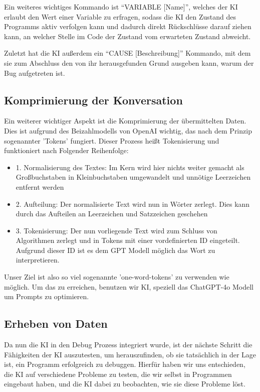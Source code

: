 \documentclass[a4paper,12pt,ngerman]{scrartcl}
\begin{document}
Ein weiteres wichtiges Kommando ist ``VARIABLE [Name]'', welches der KI erlaubt den Wert einer Variable zu erfragen, sodass die KI den Zustand des Programms aktiv verfolgen kann und dadurch direkt Rückschlüsse darauf ziehen kann, an welcher Stelle im Code der Zustand vom erwarteten Zustand abweicht.

Zuletzt hat die KI außerdem ein ``CAUSE [Beschreibung]'' Kommando, mit dem sie zum Abschluss den von ihr herausgefunden Grund ausgeben kann, warum der Bug aufgetreten ist.

\subsection{Komprimierung der Konversation}

Ein weiterer wichtiger Aspekt ist die Komprimierung der übermittelten Daten. Dies ist aufgrund des Beizahlmodells von OpenAI wichtig, das nach dem Prinzip sogenannter 'Tokens' fungiert. Dieser Prozess heißt Tokenisierung und funktioniert nach Folgender Reihenfolge:
\begin{itemize}
	\item 1. Normalisierung des Textes: Im Kern wird hier nichts weiter gemacht als Großbuchstaben in Kleinbuchstaben umgewandelt und unnötige Leerzeichen entfernt werden 
	\item 2. Aufteilung: Der normalisierte Text wird nun in Wörter zerlegt. Dies kann durch das Aufteilen an Leerzeichen und Satzzeichen geschehen
	\item 3. Tokenisierung: Der nun vorliegende Text wird zum Schluss von Algorithmen zerlegt und in Tokens mit einer vordefinierten ID eingeteilt. Aufgrund dieser ID ist es dem GPT Modell möglich das Wort zu interpretieren.
\end{itemize}
Unser Ziel ist also so viel sogenannte 'one-word-tokens' zu verwenden wie möglich. Um das zu erreichen, benutzen wir KI, speziell das ChatGPT-4o Modell um Prompts zu optimieren.

\subsection{Erheben von Daten}

Da nun die KI in den Debug Prozess integriert wurde, ist der nächste Schritt die Fähigkeiten der KI auszutesten, um herauszufinden, ob sie tatsächlich in der Lage ist, ein Programm erfolgreich zu debuggen. Hierfür haben wir uns entschieden, die KI auf verschiedene Probleme zu testen, die wir selbst in Programmen eingebaut haben, und die KI dabei zu beobachten, wie sie diese Probleme löst.
\end{document}
